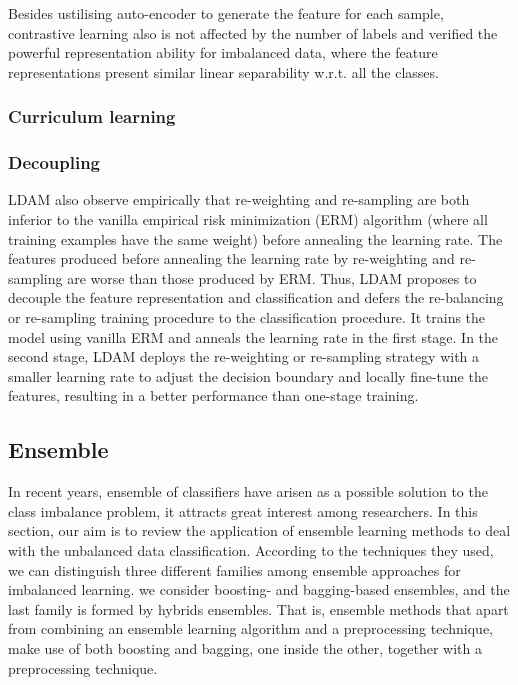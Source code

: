 Besides ustilising auto-encoder to generate the feature for each sample, contrastive learning \cite{kang2021exploring} also is not affected by the number of labels and verified the powerful representation ability for imbalanced data, where the feature representations present similar linear separability w.r.t. all the classes. 

\subsubsection{Curriculum learning}
\subsubsection{Decoupling}

LDAM \cite{cao2019learning} also observe empirically that re-weighting and re-sampling are both inferior to the vanilla empirical risk minimization (ERM) algorithm (where all training examples have the same weight) before annealing the learning rate. The features produced before annealing the learning rate by re-weighting and re-sampling are worse than those produced by ERM. Thus, LDAM proposes to decouple the feature representation and classification and defers the re-balancing or re-sampling training procedure to the classification procedure. It trains the model using vanilla ERM and anneals the learning rate in the first stage. In the second stage, LDAM deploys the re-weighting or re-sampling strategy with a smaller learning rate to adjust the decision boundary and locally fine-tune the features, resulting in a better performance than one-stage training.




\subsection{Ensemble}
In recent years, ensemble of classiﬁers have arisen as a possible solution to the class imbalance problem, it attracts great interest among researchers. In this section, our aim is to review the application of ensemble learning methods to deal with the unbalanced data classification. According to the techniques they used, we can distinguish three different families among ensemble approaches for imbalanced learning. we consider boosting- and bagging-based ensembles, and the last family is formed by hybrids ensembles. That is, ensemble methods that apart from combining an ensemble learning algorithm and a preprocessing technique, make use of both boosting and bagging, one inside the other, together with a preprocessing technique.

